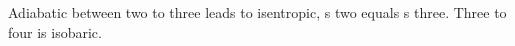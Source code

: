 Adiabatic between two to three leads to isentropic, s two equals s three. Three to four is isobaric.
